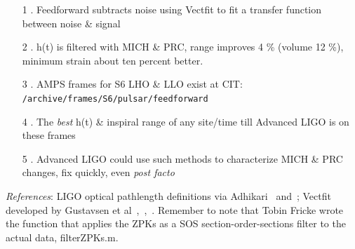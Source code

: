 \begin{itemize}
\item[1]. Feedforward subtracts noise using Vectfit to fit a transfer function between noise \& signal
\item[2]. h(t) is filtered with MICH \& PRC, range improves 4 \% (volume 12 \%), minimum strain about ten percent better.
\item[3]. AMPS frames for S6 LHO \& LLO exist at CIT:
\texttt{/archive/frames/S6/pulsar/feedforward}
\item[4]. The \textit{best} h(t) \& inspiral range of any site/time till Advanced LIGO is on these frames 
\item[5]. Advanced LIGO could use such methods to characterize MICH \& PRC changes, fix quickly, even \textit{post facto}
\end{itemize}
 
\textit{References}:
LIGO optical pathlength definitions via Adhikari~\cite{AdhikariThesis} and~\cite{BallmerThesis}; Vectfit developed by Gustavsen et al~\cite{Deschrijver2008},~\cite{Gustavsen2006},~\cite{Gustavsen1999}. Remember to note that Tobin Fricke wrote the function that applies the ZPKs as a SOS section-order-sections filter to the actual data, filterZPKs.m.

%
%
%

